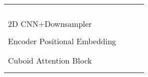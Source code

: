 \documentclass{article}
\begin{document}
\begin{table}[!tb]
\begin{center}
{\begin{tabular}{l|l|c|c}
                                                        &      &  & \\
                                                        &       &                       &              \\
                                                        &          &                       & \\\hline
    \multirow{7}{*}{2D CNN+Downsampler}                 &    &                       & \\
                                                        &    &                       &              \\
                                                        &     &                       &              \\
                                                        &       &                       &              \\
                                                        &      &  & \\
                                                        &       &                       &              \\
                                                        &          &                       & \\\hline
    Encoder Positional Embedding                        &        &                       &               \\\hline
    \multirow{9}{*}{Cuboid Attention Block }  &       &                       &               \\
                                                        &   &                       &               \\
                                                        &             &                       &               \\
                                                        &       &                       &               \\
                                                        &   &                       &               \\
                                                        &             &                       &               \\
                                                        &       &                       &               \\
                                                        &   &                       &               \\

\end{tabular}}
\end{center}
\end{table}
\end{document}
